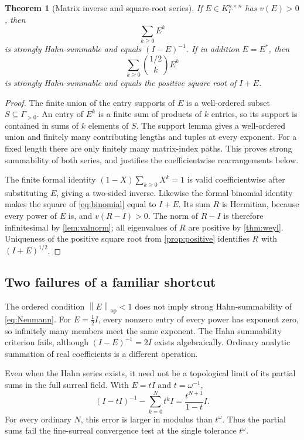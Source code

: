 \documentclass[11pt,a4paper]{article}
\numberwithin{equation}{section}
\newtheorem{theorem}{Theorem}[section]
\theoremstyle{definition}
\theoremstyle{remark}
\newcommand{\op}{\mathrm{op}}
\newcommand{\norm}[1]{\left\lVert#1\right\rVert}
\begin{document}
\begin{theorem}[Matrix inverse and square-root series]\label{thm:series}
If $E\in K_\Gamma^{n\times n}$ has $v(E)>0$, then
\begin{equation}\label{eq:Neumann}
 \sum_{k\ge0}E^k
\end{equation}
is strongly Hahn-summable and equals $(I-E)^{-1}$. If in addition $E=E^*$,
then
\begin{equation}\label{eq:binomial}
 \sum_{k\ge0}\binom{1/2}{k}E^k
\end{equation}
is strongly Hahn-summable and equals the positive square root of $I+E$.
\end{theorem}
\begin{proof}
The finite union of the entry supports of $E$ is a well-ordered subset
$S\subseteq\Gamma_{>0}$. An entry of $E^k$ is a finite sum of products
of $k$ entries, so its support is contained in sums of $k$ elements of $S$.
The support lemma gives a well-ordered union and finitely many contributing
lengths and tuples at every exponent. For a fixed length there are only
finitely many matrix-index paths. This proves strong summability of both
series, and justifies the coefficientwise rearrangements below.

The finite formal identity $(1-X)\sum_{k\ge0}X^k=1$ is valid
coefficientwise after substituting $E$, giving a two-sided inverse. Likewise
the formal binomial identity makes the square of \eqref{eq:binomial} equal
to $I+E$. Its sum $R$ is Hermitian, because every power of $E$ is, and
$v(R-I)>0$. The norm of $R-I$ is therefore infinitesimal by
\cref{lem:valnorm}; all eigenvalues of $R$ are positive by
\cref{thm:weyl}. Uniqueness of the positive square root from
\cref{prop:positive} identifies $R$ with $(I+E)^{1/2}$.
\end{proof}

\subsection{Two failures of a familiar shortcut}
The ordered condition $\norm E_{\op}<1$ does not imply strong
Hahn-summability of \eqref{eq:Neumann}. For $E=\tfrac12 I$, every nonzero
entry of every power has exponent zero, so infinitely many members meet
the same exponent. The Hahn summability criterion fails, although
$(I-E)^{-1}=2I$ exists algebraically. Ordinary analytic summation of real
coefficients is a different operation.

Even when the Hahn series exists, it need not be a topological limit of its
partial sums in the full surreal field. With $E=tI$ and $t=\omega^{-1}$,
\[
 (I-tI)^{-1}-\sum_{k=0}^{N}t^kI=\frac{t^{N+1}}{1-t}I.
\]
For every ordinary $N$, this error is larger in modulus than $t^\omega$.
Thus the partial sums fail the fine-surreal convergence test at the single
tolerance $t^\omega$.
\end{document}
